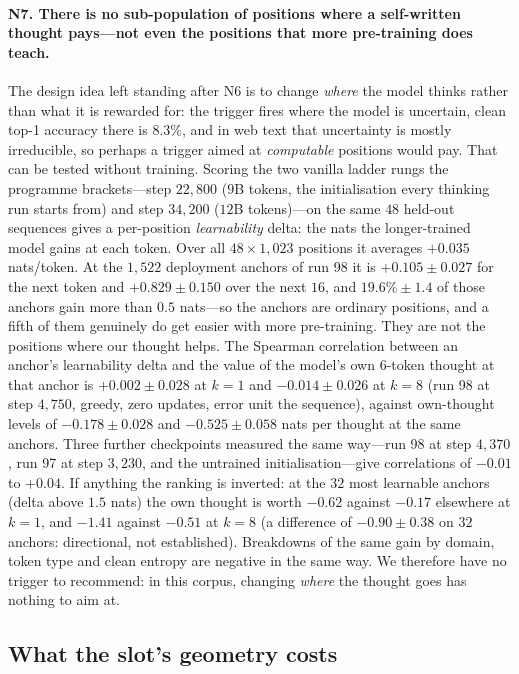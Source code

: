 \documentclass{article} %
\begin{document}
\paragraph{N7. There is no sub-population of positions where a self-written thought pays---not even the positions that more pre-training does teach.} The design idea left standing after N6 is to change \emph{where} the model thinks rather than what it is rewarded for: the trigger fires where the model is uncertain, clean top-1 accuracy there is $8.3\%$, and in web text that uncertainty is mostly irreducible, so perhaps a trigger aimed at \emph{computable} positions would pay. That can be tested without training. Scoring the two vanilla ladder rungs the programme brackets---step $22{,}800$ ($9$B tokens, the initialisation every thinking run starts from) and step $34{,}200$ ($12$B tokens)---on the same $48$ held-out sequences gives a per-position \emph{learnability} delta: the nats the longer-trained model gains at each token. Over all $48 \times 1{,}023$ positions it averages $+0.035$ nats/token. At the $1{,}522$ deployment anchors of run 98 it is $+0.105 \pm 0.027$ for the next token and $+0.829 \pm 0.150$ over the next $16$, and $19.6\% \pm 1.4$ of those anchors gain more than $0.5$ nats---so the anchors are ordinary positions, and a fifth of them genuinely do get easier with more pre-training. They are not the positions where our thought helps. The Spearman correlation between an anchor's learnability delta and the value of the model's own $6$-token thought at that anchor is $+0.002 \pm 0.028$ at $k{=}1$ and $-0.014 \pm 0.026$ at $k{=}8$ (run 98 at step $4{,}750$, greedy, zero updates, error unit the sequence), against own-thought levels of $-0.178 \pm 0.028$ and $-0.525 \pm 0.058$ nats per thought at the same anchors. Three further checkpoints measured the same way---run 98 at step $4{,}370$, run 97 at step $3{,}230$, and the untrained initialisation---give correlations of $-0.01$ to $+0.04$. If anything the ranking is inverted: at the $32$ most learnable anchors (delta above $1.5$ nats) the own thought is worth $-0.62$ against $-0.17$ elsewhere at $k{=}1$, and $-1.41$ against $-0.51$ at $k{=}8$ (a difference of $-0.90 \pm 0.38$ on $32$ anchors: directional, not established). Breakdowns of the same gain by domain, token type and clean entropy are negative in the same way. We therefore have no trigger to recommend: in this corpus, changing \emph{where} the thought goes has nothing to aim at.

\subsection{What the slot's geometry costs}
\label{sec:slotpos}
\end{document}
